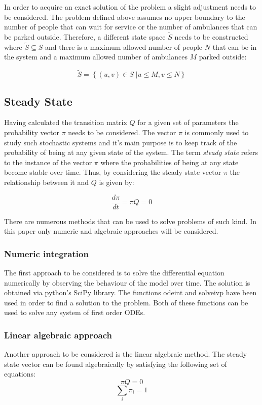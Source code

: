 In order to acquire an exact solution of the problem a slight adjustment needs to be considered. The problem defined above assumes no upper boundary to the number of people that can wait for service or the number of ambulances that can be parked outside. Therefore, a different state space \( \tilde S \) needs to be constructed where \( \tilde S \subseteq S \) and there is a maximum allowed number of people \( N \) that can be in the system and a maximum allowed number of ambulances \( M \) parked outside:

\begin{equation}
    \tilde S = \left\{ (u, v) \in S\;| u \leq M, v\leq N \right\}
\end{equation}


\subsection{Steady State}
Having calculated the transition matrix \( Q \) for a given set of parameters the probability vector \( \pi \) needs to be considered. The vector \( \pi \) is commonly used to study such stochastic systems and it's main purpose is to keep track of the probability of being at any given state of the system. The term \textit{steady state} refers to the instance of the vector \( \pi \) where the probabilities of being at any state become stable over time. Thus, by considering the steady state vector \( \pi \) the relationship between it and \(Q \) is given by:

\[
\frac{d\pi}{dt} = \pi Q = 0
\]

There are numerous methods that can be used to solve problems of such kind. In this paper only numeric and algebraic approaches will be considered. 

\subsubsection{Numeric integration}
The first approach to be considered is to solve the differential equation numerically by observing the behaviour of the model over time. The solution is obtained via python's SciPy library. The functions odeint and solve\textunderscore ivp have been used in order to find a solution to the problem. Both of these functions can be used to solve any system of first order ODEs.

\subsubsection{Linear algebraic approach}
Another approach to be considered is the linear algebraic method. The steady state vector can be found algebraically by satisfying the following set of equations:
\[ \pi Q = 0 \]
\[ \sum_{i} \pi_i = 1 \]

